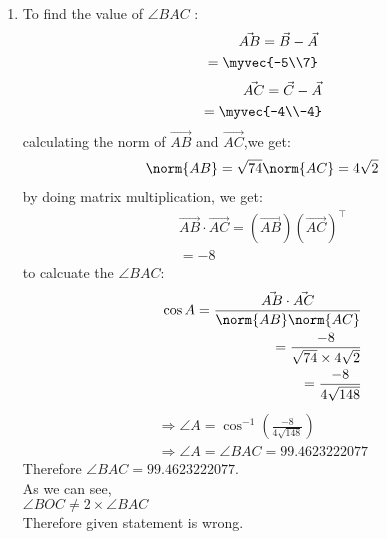 \documentclass[journal,12pt,twocolumn]{IEEEtran}
\theoremstyle{remark}
\begin{document}
\begin{enumerate}
	\item To find  the value of $\angle{BAC}$ :
\begin{align}
\Vec{AB}=\Vec{B}-\Vec{A}\\
          =\myvec{-5\\7}
\end{align}
\vspace{0.1cm}
\begin{align}
\Vec{AC}=\Vec{C}-\Vec{A}\\
          =\myvec{-4\\-4}
\end{align}
\vspace{0.1cm}
calculating the norm of $\Vec{AB}$ and $\Vec{AC}$,we get:
\begin{align}
	\norm{AB}= \sqrt{74}
	\norm{AC}= 4\sqrt{2}
\end{align}
\vspace{0.2cm}
by doing matrix multiplication, we get:
\begin{align}
\Vec{AB}\cdot\Vec{AC}=(\Vec{AB})(\Vec{AC})^\intercal\\
= -8
\end{align}
\vspace{0.2cm}
to calcuate the $\angle{BAC}$:
\begin{align}
	\cos{A}=\frac{\Vec{AB}\cdot\Vec{AC}}{\norm{AB}\norm{AC}}\\
=\frac{-8}{\sqrt{74}\times4\sqrt{2}}\\
=\frac{-8}{4\sqrt{148}}
\end{align}
\vspace{0.1cm}
\begin{align}
\Rightarrow\angle{A}=\cos^{-1}\left(\frac{-8}{4\sqrt{148}}\right)\\
\Rightarrow\angle{A}=\angle{BAC}=99.4623222077
\end{align}
\vspace{0.4cm}
Therefore $\angle{BAC}=99.4623222077$.\\
\vspace{0.5cm}
As we can see,\\ $\angle{BOC}\neq2\times\angle{BAC}$\\Therefore given statement is wrong.
\end{enumerate}
\end{document}
